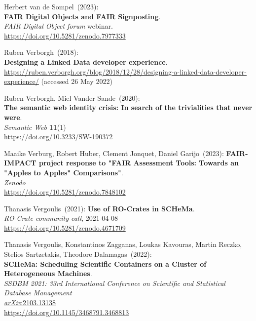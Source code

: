 \begin{thebibliography}{9}
Herbert van de Sompel~(2023): \\
\textbf{FAIR Digital Objects and FAIR Signposting}.\\
\emph{FAIR Digital Object forum} webinar.\\
\url{https://doi.org/10.5281/zenodo.7977333}

Ruben Verborgh~(2018): \\
\textbf{Designing a {Linked Data} developer experience}.\\
\url{https://ruben.verborgh.org/blog/2018/12/28/designing-a-linked-data-developer-experience/}
(accessed 26 May 2022)

Ruben Verborgh, Miel Vander Sande~(2020): \\
\textbf{The semantic web identity crisis: In search of the trivialities that never were}.\\
\emph{Semantic Web} \textbf{11}(1)\\
\url{https://doi.org/10.3233/SW-190372}

Maaike Verburg, Robert Huber, Clement Jonquet, Daniel Garijo~(2023):
\textbf{{FAIR-IMPACT project response to "FAIR Assessment Tools: Towards
an "Apples to Apples" Comparisons"}}.\\
\emph{Zenodo}\\
\url{https://doi.org/10.5281/zenodo.7848102}

Thanasis Vergoulis~(2021):  
\textbf{Use of RO-Crates in SCHeMa}.\\
\emph{RO-Crate community call}, 2021-04-08\\
\url{https://doi.org/10.5281/zenodo.4671709}

Thanasis Vergoulis, Konstantinos Zagganas, Loukas Kavouras, Martin Reczko, Stelios Sartzetakis, Theodore Dalamagas~(2022): \\
\textbf{SCHeMa: Scheduling Scientific Containers on a Cluster of
Heterogeneous Machines}.\\
\emph{SSDBM 2021: 33rd International Conference on Scientific and Statistical Database Management}\\
\href{https://doi.org/10.48550/arXiv.2103.13138}{\emph{arXiv}:2103.13138}\\
\url{https://doi.org/10.1145/3468791.3468813}


\end{thebibliography}
